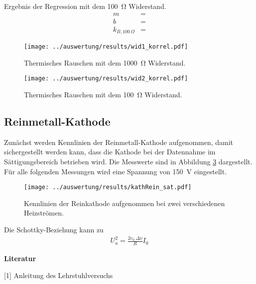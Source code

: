 Ergebnis der Regression mit dem \SI{100}{\ohm} Widerstand.
\begin{align*}
m &= \\
b &= \\
k_{B,100\,\Omega} &= 
\end{align*}

\begin{figure}[H]
	\texttt{[image: ../auswertung/results/wid1\_korrel.pdf]}
	\caption{Thermisches Rauschen mit dem \SI{1000}{\ohm} Widerstand.}
	\label{fig:thermRauschen1}
\end{figure}

\begin{figure}[H]
	\texttt{[image: ../auswertung/results/wid2\_korrel.pdf]}
	\caption{Thermisches Rauschen mit dem \SI{100}{\ohm} Widerstand.}
	\label{fig:thermRauschen2}
\end{figure}



\subsection{Reinmetall-Kathode}
Zunächst werden Kennlinien der Reinmetall-Kathode aufgenommen, damit sichergestellt werden kann, dass die Kathode bei der Datennahme im Sättigungsbereich betrieben wird. Die Messwerte sind in Abbildung \ref{fig:kennlinie} dargestellt. Für alle folgenden Messungen wird eine Spannung von \SI{150}{\volt} eingestellt.
\begin{figure}[h]
	\texttt{[image: ../auswertung/results/kathRein\_sat.pdf]}
	\caption{Kennlinien der Reinkathode aufgenommen bei zwei verschiedenen Heizströmen.}
	\label{fig:kennlinie}
\end{figure}

Die Schottky-Beziehung kann zu
\begin{align}
	U_a^2 = \frac{2e_0 \ \Delta\nu}{R} I_0
\end{align}



\vspace{2cm}
\textbf{Literatur}

\vspace{0.3cm}
[1] Anleitung des Lehrstuhlversuchs




